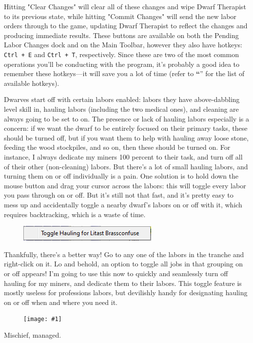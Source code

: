 \documentclass[]{article}
\newcommand{\jump}[1] {\textbf{``\nameref{sec:#1}}''}
\newcommand{\fullfigure}[1] {
\begin{figure}[h!]
\texttt{[image: \#1]}
\end{figure}
}
\newcommand{\fullfigurecaption}[1] {
\begin{center}
\vspace{-12pt}
#1
\end{center}
}
\begin{document}
\newpage
\noindent Hitting "Clear Changes" will clear all of these changes and wipe Dwarf Therapist to its
previous state, while hitting "Commit Changes" will send the new labor orders through to the game,
updating Dwarf Therapist to reflect the changes and producing immediate results. These buttons are
available on both the Pending Labor Changes dock and on the Main Toolbar, however they also have
hotkeys:
\texttt{Ctrl + E} and \texttt{Ctrl + T}, respectively. Since these are two of the most common operations
you'll be conducting with the program, it's probably a good idea to remember these hotkeys---it will save
you a lot of time (refer to \jump{Hotkeys} for the list of available hotkeys).

Dwarves start off with certain labors enabled: labors they have above-dabbling level skill in, hauling
labors (including the two medical ones), and cleaning are always going to be set to on. The presence or
lack of hauling labors especially is a concern: if we want the dwarf to be entirely focused on their
primary tasks, these should be turned off, but if you want them to help with hauling away loose stone,
feeding the wood stockpiles, and so on, then these should be turned on. For instance, I always dedicate
my miners 100 percent to their task, and turn off all of their other (non-cleaning) labors. But there's a
lot of small hauling labors, and turning them on or off individually is a pain.  One solution is to hold
down the mouse button and drag your cursor across the labors: this will toggle every labor you pass
through on or off. But it's still not that fast, and it's pretty easy to mess up and accidentally toggle
a nearby dwarf's labors on or off with it, which requires backtracking, which is a waste of time.

\begin{figure}
\vspace{-20pt}
  \begin{center}
    \includegraphics{Sec2Fig4}
  \end{center}
\vspace{-10pt}
\end{figure}
Thankfully, there's a better way! Go to any one of the labors in the tranche and right-click on it. Lo
and behold, an option to toggle all jobs in that grouping on or off appears! I'm going to use this now to
quickly and seamlessly turn off hauling for my miners, and dedicate them to their labors. This toggle
feature is mostly useless for professions labors, but devilishly handy for designating hauling on or off
when and where you need it.
\fullfigure{Sec2Fig5}
\fullfigurecaption{Mischief, managed.}
\end{document}
